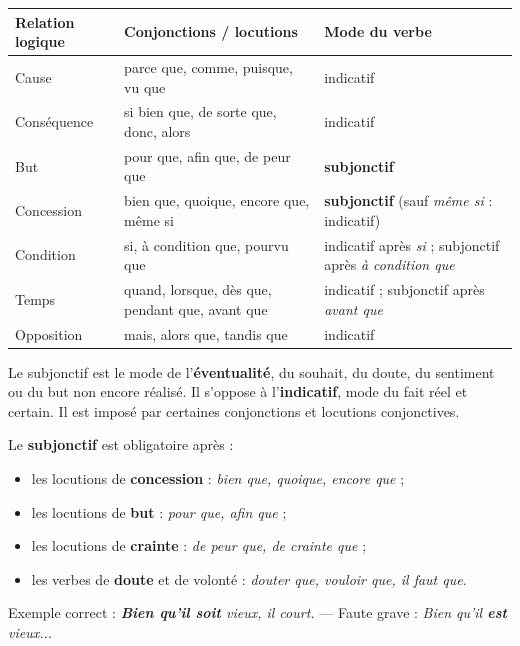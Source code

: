 \documentclass[11pt]{article}
\newcommand{\cle}[1]{{\popxbold\color{popdark}#1}}
\newcounter{popsec}
\newcounter{popsub}
\newcommand{\courssub}[1]{%
  \stepcounter{popsub}%
  \par\vspace{9pt}\noindent{\popxbold\fontsize{11.5}{13}\selectfont\color{popink}{\color{poporange}\thepopsec.\thepopsub}\hspace{6pt}#1}\par\nopagebreak\vspace{4pt}
}
\begin{document}
\begin{center}
\begin{tabularx}{\linewidth}{|l|X|X|}
\hline
\rowcolor{popblueL} \textbf{Relation logique} & \textbf{Conjonctions / locutions} & \textbf{Mode du verbe} \\
\hline
Cause & parce que, comme, puisque, vu que & indicatif \\
\hline
Conséquence & si bien que, de sorte que, donc, alors & indicatif \\
\hline
But & pour que, afin que, de peur que & \textbf{subjonctif} \\
\hline
Concession & bien que, quoique, encore que, même si & \textbf{subjonctif} (sauf \emph{même si} : indicatif) \\
\hline
Condition & si, à condition que, pourvu que & indicatif après \emph{si} ; subjonctif après \emph{à condition que} \\
\hline
Temps & quand, lorsque, dès que, pendant que, avant que & indicatif ; subjonctif après \emph{avant que} \\
\hline
Opposition & mais, alors que, tandis que & indicatif \\
\hline
\end{tabularx}
\end{center}

\courssub{Le piège du subjonctif}

\begin{definition}
Le \cle{subjonctif} est le mode de l'\textbf{éventualité}, du souhait, du doute, du sentiment ou du but non encore réalisé. Il s'oppose à l'\textbf{indicatif}, mode du fait réel et certain. Il est imposé par certaines conjonctions et locutions conjonctives.
\end{definition}

\begin{propriete}
Le \textbf{subjonctif} est obligatoire après :
\begin{itemize}
\item les locutions de \textbf{concession} : \emph{bien que, quoique, encore que} ;
\item les locutions de \textbf{but} : \emph{pour que, afin que} ;
\item les locutions de \textbf{crainte} : \emph{de peur que, de crainte que} ;
\item les verbes de \textbf{doute} et de volonté : \emph{douter que, vouloir que, il faut que}.
\end{itemize}
Exemple correct : \emph{\textbf{Bien qu'il soit} vieux, il court.} — Faute grave : \emph{Bien qu'il \textbf{est} vieux...}
\end{propriete}
\end{document}
